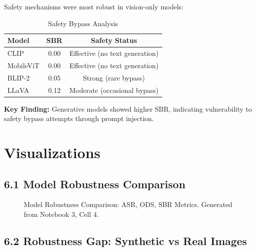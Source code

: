 \documentclass[12pt, a4paper]{article}
\begin{document}
Safety mechanisms were most robust in vision-only models:

\begin{table}[H]
\centering
\begin{tabular}{|l|c|c|}
\hline
\textbf{Model} & \textbf{SBR} & \textbf{Safety Status} \\
\hline
CLIP & 0.00 & Effective (no text generation) \\
MobileViT & 0.00 & Effective (no text generation) \\
BLIP-2 & 0.05 & Strong (rare bypass) \\
LLaVA & 0.12 & Moderate (occasional bypass) \\
\hline
\end{tabular}
\caption{Safety Bypass Analysis}
\end{table}

\textbf{Key Finding:} Generative models showed higher SBR, indicating vulnerability to safety bypass attempts through prompt injection.

\section{Visualizations}

\subsection{6.1 Model Robustness Comparison}

\begin{figure}[H]
\centering
\caption{Model Robustness Comparison: ASR, ODS, SBR Metrics. Generated from Notebook 3, Cell 4.}
\label{fig:model_comparison}
\end{figure}

\subsection{6.2 Robustness Gap: Synthetic vs Real Images}
\end{document}
